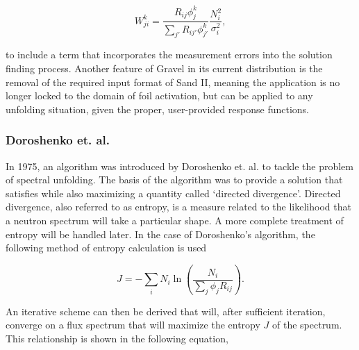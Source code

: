 \begin{equation}
\label{eqn:gravel-w}
W_{ji}^k = \frac{R_{ij} \phi_{j}^k}{\sum_{j'} R_{ij'} \phi_{j'}^k} \frac{N_i^2}{\sigma_i^2} ,
\end{equation}

\noindent
to include a term that incorporates the measurement errors into the solution finding process.
Another feature of Gravel in its current distribution is the removal of the required input format of Sand II, meaning the application is no longer locked to the domain of foil activation, but can be applied to any unfolding situation, given the proper, user-provided response functions.



\subsubsection{Doroshenko et. al.}

In 1975, an algorithm was introduced by Doroshenko et. al. to tackle the problem of spectral unfolding.
The basis of the algorithm was to provide a solution that satisfies  while also maximizing a quantity called `directed divergence'.
Directed divergence, also referred to as entropy, is a measure related to the likelihood that a neutron spectrum will take a particular shape.
A more complete treatment of entropy will be handled later.
In the case of Doroshenko's algorithm, the following method of entropy calculation is used

\begin{equation}
\label{eqn:doroshenko-entropy}
J = - \sum_i N_i \ln(\frac{N_i}{\sum_j \phi_j R_{ij}}) .
\end{equation}

An iterative scheme can then be derived that will, after sufficient iteration, converge on a flux spectrum that will maximize the entropy $J$ of the spectrum.
This relationship is shown in the following equation,

